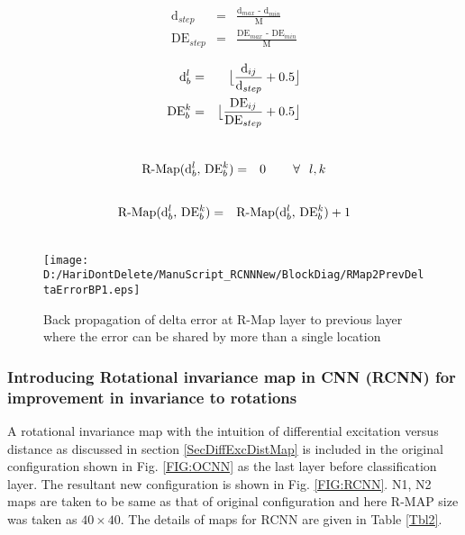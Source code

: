 \begin{eqnarray}
 \label{dStep}
\text{d$_{step}$} & = & \frac{\text{d$_{max}$ - d$_{min}$}}{\text{M}} \\ \label{DEstep}
\text{DE$_{step}$} & = & \frac{\text{DE$_{max}$ - DE$_{min}$}}{\text{M}} \\
\nonumber
\end{eqnarray}
\vspace*{-1in}
\begin{eqnarray}
 \label{dbinloc}
\text{d$^{l}_{b}$} & = &\big{\lfloor} \frac{\text{d$_{ij}$}}{\text{d$_{step}$}}+0.5 \big{\rfloor}\\ \label{DEbinloc}
\text{DE$^{k}_{b}$} & = & \big{\lfloor} \frac{\text{DE$_{ij}$}}{\text{DE$_{step}$}}+0.5 \big{\rfloor} \\
\nonumber
\end{eqnarray}
\vspace*{-1in}

\begin{eqnarray}
 \label{RMapInit}
\text{R-Map(\text{d$^{l}_{b}$}, \text{DE$^{k}_{b}$})} & = & {0 \hspace{0.3in} \forall \hspace{0.1in} {l,k}}\\ 
\nonumber
\end{eqnarray}
\vspace*{-1in}
\begin{eqnarray}
 \label{RMapping}
\text{R-Map(\text{d$^{l}_{b}$}, \text{DE$^{k}_{b}$})} & = & \text{R-Map(\text{d$^{l}_{b}$}, \text{DE$^{k}_{b}$})}+1 \\ 
\nonumber
\end{eqnarray}

\begin{figure*}
 \centering
 \texttt{[image: D:/HariDontDelete/ManuScript\_RCNNNew/BlockDiag/RMap2PrevDeltaErrorBP1.eps]}
 \caption{Back propagation of delta error at R-Map layer to previous layer where the error can be shared by more than a single location}
 \label{Fig:RMap2PrevBackErr}
\end{figure*}

\subsubsection{Introducing Rotational invariance map in CNN (RCNN) for improvement in invariance to rotations}
\label{RCNNConfigb}
A rotational invariance map with the intuition of differential excitation versus distance as discussed in section \ref{SecDiffExcDistMap} is included in the original configuration shown in Fig. \ref{FIG:OCNN} as the last layer before classification layer. The resultant new configuration is shown in Fig. \ref{FIG:RCNN}. N1, N2 maps are taken to be same as that of original configuration and here R-MAP size was taken as $40\times40$. The details of maps for RCNN are given in Table \ref{Tbl2}.\\


